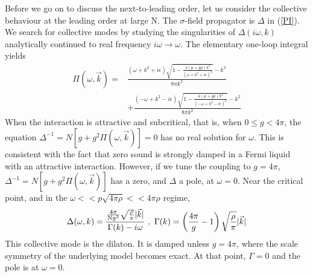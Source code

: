 \documentclass[twocolumn,secnumarabic,amssymb, nobibnotes, aps, prd]{revtex4}
\begin{document}
 Before we go on to discuss the next-to-leading order, let us consider the collective behaviour
 at the leading order at large N.   
 The $\sigma$-field propagator is $\Delta$ in (\ref{PI}).  We search for collective modes by studying the singularities of $\Delta(i\omega,k)$
 analytically continued to real frequency $i\omega\to \omega$. 
  The elementary one-loop integral yields
\begin{align}
\Pi(\omega,\vec k)= &  \frac{ (\omega+{k}^2+i\epsilon) \sqrt{1-    \frac{ 4(\mu+g\rho){k}^2}  {(\omega+{k}^2+i\epsilon)^2}  } -k^2} {8\pi {k}^2} \nonumber  \\
&+\frac{ (-\omega+{k}^2-i\epsilon) \sqrt{1-    \frac{ 4(\mu+g\rho){k}^2}  {(-\omega+{k}^2-i\epsilon)^2}  } -k^2} {8\pi {k}^2}   \nonumber 
\end{align}
 When the interaction is attractive and subcritical, that is, when $0\leq g<4\pi $, the equation $\Delta^{-1}=N[g+g^2\Pi(\omega,\vec k)]=0$ has no real solution for $\omega$.  This is 
consistent with the fact that zero sound is strongly damped in a Fermi liquid with 
an attractive interaction. 
 However,   
if we tune the coupling to $g=4\pi$,  $\Delta^{-1}=N[g+g^2\Pi(\omega,\vec k)]$  has a zero, and $\Delta$ a pole,  at $\omega=0$.  
Near the critical point, and in the $\omega<<p\sqrt{4\pi\rho}<<4\pi\rho$ regime, 
\begin{align}\label{ss}
\Delta(\omega,k)=\frac{\frac{4\pi}{{\rm N}g^2}\sqrt{\frac{\rho}{\pi}}|\vec k|}{\Gamma(k)-i\omega}
~,~
\Gamma(k)=\left(\frac{4\pi}{g}-1\right)  \sqrt{\frac{\rho}{\pi }}|\vec k| 
\end{align}
This collective mode is the dilaton.  It is  damped unless  $g=4\pi$, where the  scale symmetry
of the underlying model becomes exact.  At that point, $\Gamma=0$ and the pole is at $\omega=0$. 
 
\end{document}
